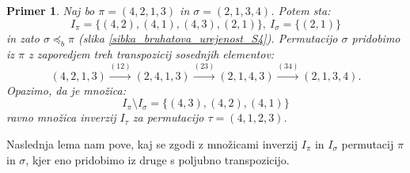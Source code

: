 \documentclass[a4paper, 12pt]{book}
\newtheorem{primer}{Primer}[chapter]
\begin{document}
\begin{primer}
\label{primer_nepreimenovanje_elementov_mnozice_inverzij}
    Naj bo $\pi = (4, 2, 1, 3)$ in $\sigma = (2, 1, 3, 4)$. Potem sta:
    \[I_{\pi} = \{ (4, 2), (4, 1), (4, 3), (2, 1) \}, \ I_{\sigma} = \{ (2, 1) \}\]
    in zato $\sigma \preceq_b \pi$ (slika \ref{sibka_bruhatova_urejenost_S4}). Permutacijo $\sigma$ pridobimo iz $\pi$ z zaporedjem treh transpozicij sosednjih elementov:
    \[
        (4, 2, 1, 3) \overset{(12)}{\rightarrow} (2, 4, 1, 3) \overset{(23)}{\rightarrow} (2, 1, 4, 3) \overset{(34)}{\rightarrow} (2, 1, 3, 4).
    \]
    Opazimo, da je množica:
    \[
        I_{\pi} \setminus I_{\sigma} = \{ (4, 3), (4, 2), (4, 1) \}
    \]
    ravno množica inverzij $I_{\tau}$ za permutacijo $\tau = (4, 1, 2, 3)$.
\end{primer}

Naslednja lema nam pove, kaj se zgodi z množicami inverzij $I_{\pi}$ in $I_{\sigma}$ permutacij $\pi$ in $\sigma$, kjer eno pridobimo iz druge s poljubno transpozicijo.
\end{document}
